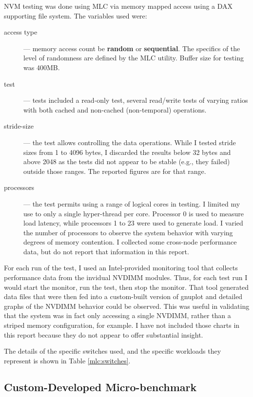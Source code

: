 NVM testing was done using MLC via memory mapped access using a \acs{DAX} supporting file system.  The variables used were:

\begin{description}
    \item[access type] --- memory access count be \textbf{random} or \textbf{sequential}.  The specifics of the level of randomness are defined by the MLC utility. Buffer size for testing was 400MB.
    \item[test] --- tests included a read-only test, several read/write tests of varying ratios with both cached and non-cached (non-temporal) operations.
    \item[stride-size] --- the test allows controlling the data operations.  While I tested stride sizes from 1 to 4096 bytes, I discarded the results below 32 bytes and above 2048 as the tests did not appear to be stable (e.g., they failed) outside those ranges.  The reported figures are for that range.
    \item[processors] --- the test permits using a range of logical cores in testing.  I limited my use to only a single hyper-thread per core.  Processor 0 is used to measure load latency, while processors 1 to 23 were used to generate load.  I varied the number of processors to observe the system behavior with varying degrees of memory contention.  I collected some cross-node performance data, but do not report that information in this report.
\end{description}

For each run of the test, I used an Intel-provided monitoring tool that collects performance data from the invidual NVDIMM modules.  Thus, for each test run I would start the monitor, run the test, then stop the monitor.  That tool generated data files that were then fed into a custom-built version of gnuplot and detailed graphs of the NVDIMM behavior could be observed.  This was useful in validating that the system was in fact only accessing a single NVDIMM, rather than a striped memory configuration, for example.  I have not included those charts in this report because they do not appear to offer substantial insight.

The details of the specific switches used, and the specific workloads they represent is shown in Table \ref{mlc:switches}.

\subsection{Custom-Developed Micro-benchmark}\label{section:model:methodology:perc}

